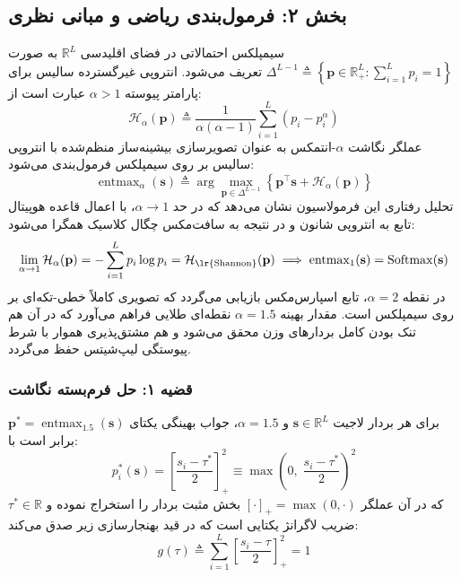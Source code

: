 \subsection*{بخش ۲: فرمول‌بندی ریاضی و مبانی نظری }
سیمپلکس احتمالاتی در فضای اقلیدسی $\mathbb{R}^L$ به صورت $\Delta^{L-1} \triangleq \left\{ \mathbf{p} \in \mathbb{R}_+^L : \sum_{i=1}^L p_i = 1 \right\}$ تعریف می‌شود. انتروپی غیرگسترده سالیس  برای پارامتر پیوسته $\alpha > 1$ عبارت است از:
\begin{equation}
\mathcal{H}_\alpha(\mathbf{p}) \triangleq \frac{1}{\alpha(\alpha - 1)} \sum_{i=1}^L \left( p_i - p_i^\alpha \right)
\end{equation}
عملگر نگاشت $\alpha$-انتمکس به عنوان تصویرسازی بیشینه‌ساز منظم‌شده با انتروپی سالیس بر روی سیمپلکس فرمول‌بندی می‌شود:
\begin{equation}
\operatorname{entmax}_\alpha(\mathbf{s}) \triangleq \arg\max_{\mathbf{p} \in \Delta^{L-1}} \left\{ \mathbf{p}^\top \mathbf{s} + \mathcal{H}_\alpha(\mathbf{p}) \right\}
\end{equation}
تحلیل رفتاری این فرمولاسیون نشان می‌دهد که در حد $\alpha \to 1$، با اعمال قاعده هوپیتال تابع به انتروپی شانون و در نتیجه به سافت‌مکس چگال کلاسیک همگرا می‌شود:
\begin{equation}
\lim_{\alpha \to 1} \mathcal{H}_\alpha(\mathbf{p}) = -\sum_{i=1}^L p_i \log p_i = \mathcal{H}_{\text{\lr{Shannon}}}(\mathbf{p}) \implies \operatorname{entmax}_1(\mathbf{s}) = \operatorname{Softmax}(\mathbf{s})
\end{equation}
در نقطه $\alpha = 2$، تابع اسپارس‌مکس  بازیابی می‌گردد که تصویری کاملاً خطی-تکه‌ای بر روی سیمپلکس است. مقدار بهینه $\alpha = 1.5$ نقطه‌ای طلایی فراهم می‌آورد که در آن هم تنک بودن کامل بردارهای وزن محقق می‌شود و هم مشتق‌پذیری هموار با شرط پیوستگی لیپ‌شیتس  حفظ می‌گردد.

\subsubsection*{قضیه ۱: حل فرم‌بسته نگاشت }
برای هر بردار لاجیت $\mathbf{s} \in \mathbb{R}^L$ و $\alpha = 1.5$، جواب بهینگی یکتای $\mathbf{p}^* = \operatorname{entmax}_{1.5}(\mathbf{s})$ برابر است با:
\begin{equation}
p_i^*(\mathbf{s}) = \left[ \frac{s_i - \tau^*}{2} \right]_+^2 \equiv \max\left(0, \; \frac{s_i - \tau^*}{2}\right)^2
\end{equation}
که در آن عملگر $[\cdot]_+ = \max(0, \cdot)$ بخش مثبت بردار را استخراج نموده و $\tau^* \in \mathbb{R}$ ضریب لاگرانژ یکتایی است که در قید بهنجارسازی زیر صدق می‌کند:
\begin{equation}
g(\tau) \triangleq \sum_{i=1}^L \left[ \frac{s_i - \tau}{2} \right]_+^2 = 1
\end{equation}

